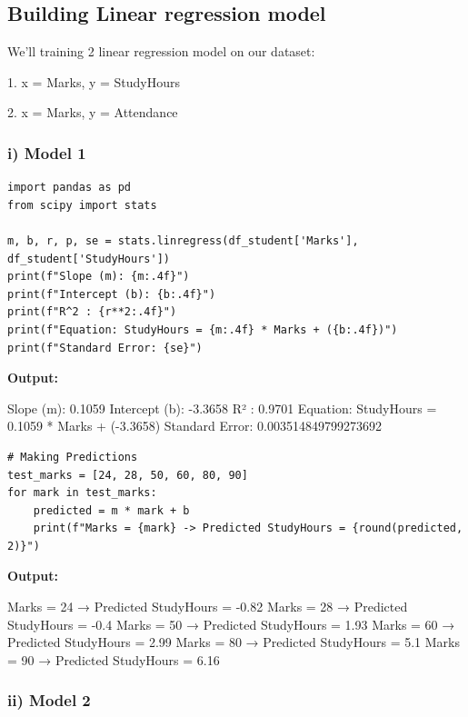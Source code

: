 
\subsection{Building Linear regression model}

We'll training 2 linear regression model on our dataset:

1. x = Marks, y = StudyHours

2. x = Marks, y = Attendance

\subsubsection*{i) Model 1}

\begin{lstlisting}[style=python]
import pandas as pd 
from scipy import stats

m, b, r, p, se = stats.linregress(df_student['Marks'], df_student['StudyHours'])
print(f"Slope (m): {m:.4f}")
print(f"Intercept (b): {b:.4f}")
print(f"R^2 : {r**2:.4f}")
print(f"Equation: StudyHours = {m:.4f} * Marks + ({b:.4f})")
print(f"Standard Error: {se}")
\end{lstlisting}

\textbf{Output:}

Slope (m): 0.1059
Intercept (b): -3.3658
R² : 0.9701
Equation: StudyHours = 0.1059 * Marks + (-3.3658)
Standard Error: 0.003514849799273692

\gap

\begin{lstlisting}[style=python]
# Making Predictions
test_marks = [24, 28, 50, 60, 80, 90]
for mark in test_marks:
    predicted = m * mark + b
    print(f"Marks = {mark} -> Predicted StudyHours = {round(predicted, 2)}")
\end{lstlisting}

\textbf{Output:}

Marks = 24 → Predicted StudyHours = -0.82
Marks = 28 → Predicted StudyHours = -0.4
Marks = 50 → Predicted StudyHours = 1.93
Marks = 60 → Predicted StudyHours = 2.99
Marks = 80 → Predicted StudyHours = 5.1
Marks = 90 → Predicted StudyHours = 6.16


\subsubsection*{ii) Model 2}

